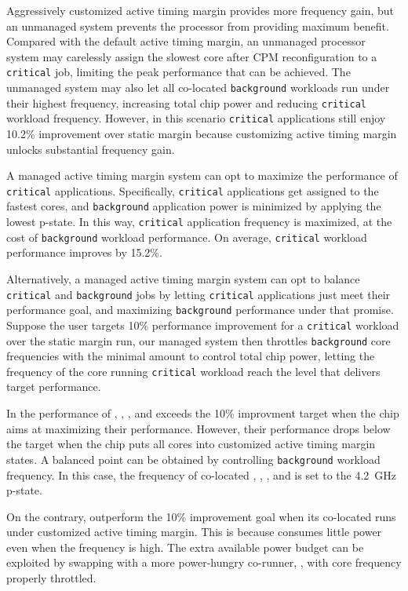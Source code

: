Aggressively customized active timing margin provides more frequency gain, but an unmanaged system prevents the processor from providing maximum benefit. Compared with the default active timing margin, an unmanaged processor system may carelessly assign the slowest core after CPM reconfiguration to a \texttt{critical} job, limiting the peak performance that can be achieved. The unmanaged system may also let all co-located \texttt{background} workloads run under their highest frequency, increasing total chip power and reducing \texttt{critical} workload frequency. However, in this scenario \texttt{critical} applications still enjoy 10.2\% improvement over static margin because customizing active timing margin unlocks substantial frequency gain.

A managed active timing margin system can opt to maximize the performance of \texttt{critical} applications. Specifically, \texttt{critical} applications get assigned to the fastest cores, and \texttt{background} application power is minimized by applying the lowest p-state. In this way, \texttt{critical} application frequency is maximized, at the cost of \texttt{background} workload performance. On average, \texttt{critical} workload performance improves by 15.2\%.

Alternatively, a managed active timing margin system can opt to balance \texttt{critical} and \texttt{background} jobs by letting \texttt{critical} applications just meet their performance goal, and maximizing \texttt{background} performance under that promise. Suppose the user targets 10\% performance improvement for a \texttt{critical} workload over the static margin run, our managed system then throttles \texttt{background} core frequencies with the minimal amount to control total chip power, letting the frequency of the core running \texttt{critical} workload reach the level that delivers target performance.

In  the performance of , , , and  exceeds the 10\% improvment target when the chip aims at maximizing their performance. However, their performance drops below the target when the chip puts all cores into customized active timing margin states. A balanced point can be obtained by controlling \texttt{background} workload frequency. In this case, the frequency of co-located , , , and  is set to the 4.2~GHz p-state.

On the contrary,  outperform the 10\% improvement goal when its co-located  runs under customized active timing margin. This is because  consumes little power even when the frequency is high. The extra available power budget can be exploited by swapping  with a more power-hungry co-runner, , with core frequency properly throttled. 

